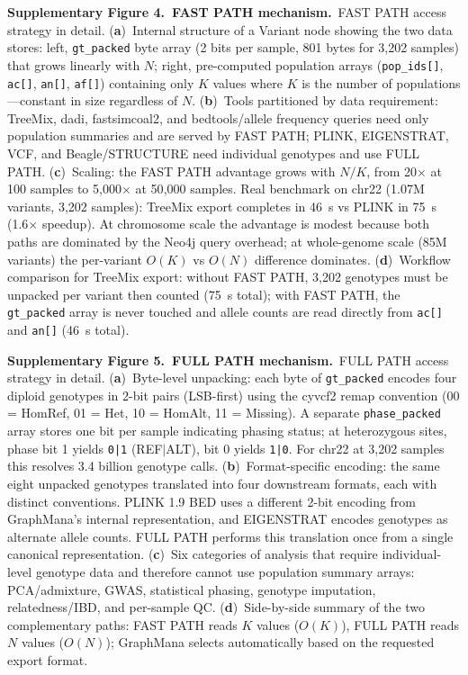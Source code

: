 \documentclass[11pt,a4paper]{article}
\begin{document}
\vspace{0.8em}

\noindent\textbf{Supplementary Figure 4.~FAST PATH mechanism.}~FAST PATH access strategy in detail. (\textbf{a})~Internal structure of a Variant node showing the two data stores: left, \texttt{gt\_packed} byte array (2 bits per sample, 801 bytes for 3,202 samples) that grows linearly with $N$; right, pre-computed population arrays (\texttt{pop\_ids[]}, \texttt{ac[]}, \texttt{an[]}, \texttt{af[]}) containing only $K$ values where $K$ is the number of populations---constant in size regardless of $N$. (\textbf{b})~Tools partitioned by data requirement: TreeMix, dadi, fastsimcoal2, and bedtools/allele frequency queries need only population summaries and are served by FAST PATH; PLINK, EIGENSTRAT, VCF, and Beagle/STRUCTURE need individual genotypes and use FULL PATH. (\textbf{c})~Scaling: the FAST PATH advantage grows with $N/K$, from 20$\times$ at 100 samples to 5{,}000$\times$ at 50{,}000 samples. Real benchmark on chr22 (1.07M variants, 3,202 samples): TreeMix export completes in 46~s vs PLINK in 75~s (1.6$\times$ speedup). At chromosome scale the advantage is modest because both paths are dominated by the Neo4j query overhead; at whole-genome scale (85M variants) the per-variant $O(K)$ vs $O(N)$ difference dominates. (\textbf{d})~Workflow comparison for TreeMix export: without FAST PATH, 3,202 genotypes must be unpacked per variant then counted (75~s total); with FAST PATH, the \texttt{gt\_packed} array is never touched and allele counts are read directly from \texttt{ac[]} and \texttt{an[]} (46~s total).

\vspace{0.8em}

\noindent\textbf{Supplementary Figure 5.~FULL PATH mechanism.}~FULL PATH access strategy in detail. (\textbf{a})~Byte-level unpacking: each byte of \texttt{gt\_packed} encodes four diploid genotypes in 2-bit pairs (LSB-first) using the cyvcf2 remap convention (00 = HomRef, 01 = Het, 10 = HomAlt, 11 = Missing). A separate \texttt{phase\_packed} array stores one bit per sample indicating phasing status; at heterozygous sites, phase bit 1 yields \texttt{0|1} (REF$|$ALT), bit 0 yields \texttt{1|0}. For chr22 at 3,202 samples this resolves 3.4 billion genotype calls. (\textbf{b})~Format-specific encoding: the same eight unpacked genotypes translated into four downstream formats, each with distinct conventions. PLINK 1.9 BED uses a different 2-bit encoding from GraphMana's internal representation, and EIGENSTRAT encodes genotypes as alternate allele counts. FULL PATH performs this translation once from a single canonical representation. (\textbf{c})~Six categories of analysis that require individual-level genotype data and therefore cannot use population summary arrays: PCA/admixture, GWAS, statistical phasing, genotype imputation, relatedness/IBD, and per-sample QC. (\textbf{d})~Side-by-side summary of the two complementary paths: FAST PATH reads $K$ values ($O(K)$), FULL PATH reads $N$ values ($O(N)$); GraphMana selects automatically based on the requested export format.
\end{document}
